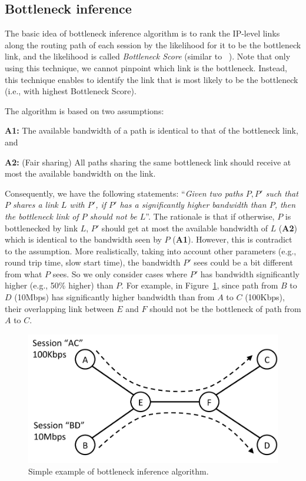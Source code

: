 \subsection{Bottleneck inference}
The basic idea of bottleneck inference algorithm is to rank the IP-level links
along the routing path of each session by the likelihood for it to be the bottleneck
link, and the likelihood is called {\it Bottleneck Score} (similar to ~\cite{agarwal2010webprofiler}). Note that only using this technique, we
cannot pinpoint which link is the bottleneck. Instead, this technique
enables to identify the link that is most likely to be the bottleneck
(i.e., with highest Bottleneck Score). 

The algorithm is based on two assumptions:
\begin{packeditemize}
	\item {\bf A1:} The available bandwidth of a path is identical to that of the bottleneck link, and 
	\item {\bf A2:} (Fair sharing) All paths sharing the same bottleneck link should receive at most the available bandwidth on the link.
\end{packeditemize}
Consequently, we have the following statements: ``{\it Given two paths $P,P'$ such that $P$ shares a link $L$ with $P'$, if $P'$ has a significantly higher bandwidth than $P$, then the bottleneck link of $P$ should not be $L$}''. The rationale is that if otherwise, $P$ is bottlenecked by link $L$, $P'$ should get at most the available bandwidth of $L$ ({\bf A2}) which is identical to the bandwidth seen by $P$ ({\bf A1}). However, this is contradict to the assumption. 
More realistically, taking into account other  parameters (e.g., round trip time, slow start time), the bandwidth $P'$ sees could be a bit different from what $P$ sees. So we only consider cases where $P'$ has bandwidth significantly higher (e.g., 50\% higher) than $P$. For example, in Figure~\ref{fig:idea:example}, since path from  $B$ to $D$ (10Mbps) has significantly higher bandwidth than from $A$ to $C$ (100Kbps), their overlapping link between $E$ and $F$ should not be the bottleneck of path from $A$ to $C$.

\begin{figure}[h]
\begin{center}
\includegraphics[scale=0.4] {figures/bottleneckExample.pdf}
\vspace{-0.5cm}
\caption{Simple example of bottleneck inference algorithm.}
\label{fig:idea:example}
\end{center}
\end{figure}

